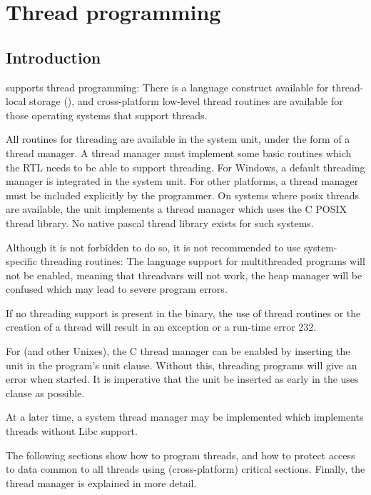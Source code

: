\chapter{Thread programming}

\section{Introduction}
\fpc supports thread programming: There is a language construct 
available for thread-local storage (), and cross-platform
low-level thread routines are available for those operating systems that
support threads.

All routines for threading are available in the system unit, under the form 
of a thread manager. A thread manager must implement some basic routines
which the RTL needs to be able to support threading. For Windows, a default
threading manager is integrated in the system unit. For other platforms,
a thread manager must be included explicitly by the programmer. On systems
where posix threads are available, the  unit implements a
thread manager which uses the C POSIX  thread library. No native pascal
thread library exists for such systems.

Although it is not forbidden to do so, it is not recommended to use system-specific 
threading routines: The language support for multithreaded programs will not be 
enabled, meaning that threadvars will not work, the heap manager will be confused 
which may lead to severe program errors.

If no threading support is present in the binary, the use of thread routines
or the creation of a thread will result in an exception or a run-time error 232.

For \linux (and other Unixes), the C thread manager can be enabled by inserting the
 unit in the program's unit clause. Without this, threading programs 
will give an error when started. It is imperative that the unit be inserted
as early in the uses clause as possible.

At a later time, a system thread manager may be implemented which implements threads
without Libc support.

The following sections show how to program threads, and how to protect access to
data common to all threads using (cross-platform) critical sections. 
Finally, the thread manager is explained in more detail.

